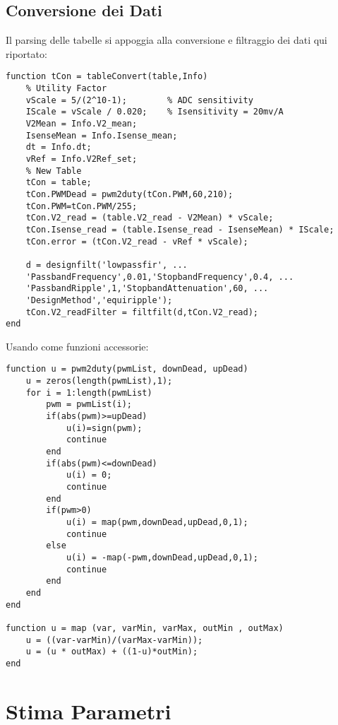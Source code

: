 \subsection{Conversione dei Dati}
Il parsing delle tabelle si appoggia alla conversione e filtraggio dei dati qui riportato:
\begin{lstlisting}[style=matlabStyle,caption={Parsing delle tabelle},label=lst:dataFilter]
function tCon = tableConvert(table,Info)
	% Utility Factor
	vScale = 5/(2^10-1);        % ADC sensitivity
	IScale = vScale / 0.020;    % Isensitivity = 20mv/A
	V2Mean = Info.V2_mean;
	IsenseMean = Info.Isense_mean;
	dt = Info.dt;
	vRef = Info.V2Ref_set;
	% New Table
	tCon = table;
	tCon.PWMDead = pwm2duty(tCon.PWM,60,210);
	tCon.PWM=tCon.PWM/255;
	tCon.V2_read = (table.V2_read - V2Mean) * vScale;
	tCon.Isense_read = (table.Isense_read - IsenseMean) * IScale;
	tCon.error = (tCon.V2_read - vRef * vScale);
	
	d = designfilt('lowpassfir', ...
	'PassbandFrequency',0.01,'StopbandFrequency',0.4, ...
	'PassbandRipple',1,'StopbandAttenuation',60, ...
	'DesignMethod','equiripple');
	tCon.V2_readFilter = filtfilt(d,tCon.V2_read);
end
\end{lstlisting}
Usando come funzioni accessorie:
\begin{lstlisting}[style=matlabStyle,caption={Parsing delle tabelle},label=lst:deadzoneRemove] 
function u = pwm2duty(pwmList, downDead, upDead)
	u = zeros(length(pwmList),1);
	for i = 1:length(pwmList)
		pwm = pwmList(i);
		if(abs(pwm)>=upDead)
			u(i)=sign(pwm);
			continue
		end
		if(abs(pwm)<=downDead)
			u(i) = 0;
			continue
		end
		if(pwm>0)
			u(i) = map(pwm,downDead,upDead,0,1);
			continue
		else
			u(i) = -map(-pwm,downDead,upDead,0,1);
			continue
		end
	end
end

function u = map (var, varMin, varMax, outMin , outMax)
	u = ((var-varMin)/(varMax-varMin));
	u = (u * outMax) + ((1-u)*outMin);
end
\end{lstlisting}


\section{Stima Parametri}

